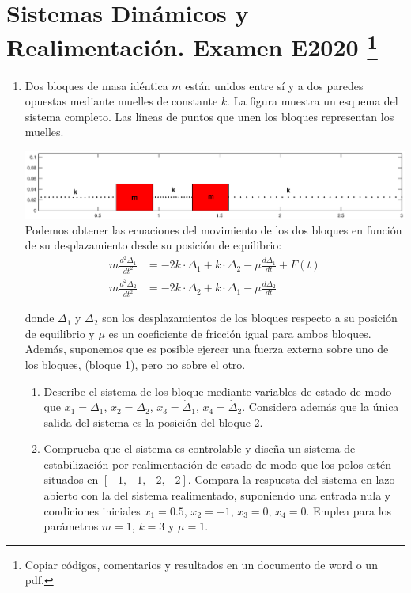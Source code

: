 \documentclass[10pt,a4paper]{article}
\begin{document}
\thispagestyle{fancy}

\section*{Sistemas Dinámicos y Realimentación. Examen E2020 \protect\footnote{Copiar códigos, comentarios y resultados en un documento de word o un pdf.}}

\begin{enumerate}
\item Dos bloques de masa idéntica $m$ están unidos entre sí y a dos paredes opuestas mediante muelles de constante $k$. La figura muestra un esquema del sistema completo. Las líneas de puntos que unen los bloques representan los muelles.

\includegraphics[width=\textwidth]{bloquecitos.eps}
Podemos obtener las ecuaciones del movimiento de los dos bloques en función de su desplazamiento desde su posición de equilibrio:
\begin{align*}
m\frac{d^2\Delta_1}{dt^2} &= -2k\cdot \Delta_1 +k\cdot \Delta_2 -\mu\frac{d\Delta_1}{dt}+F(t)\\
m\frac{d^2\Delta_2}{dt^2} &= -2k\cdot \Delta_2 +k\cdot \Delta_1 -\mu\frac{d\Delta_2}{dt}
\end{align*}

donde $\Delta_1$ y $\Delta_2$ son los desplazamientos de los bloques respecto a su posición de equilibrio y $\mu$ es un coeficiente de fricción igual para ambos bloques. Además, suponemos que es posible ejercer una fuerza externa sobre uno de los bloques, (bloque 1), pero no sobre el otro.
\begin{enumerate}
\item Describe el sistema de los bloque mediante variables de estado de modo que $x_1=\Delta_1$, $x_2 =\Delta_2$, $x_3=\dot{\Delta}_1$, $x_4=\dot{\Delta}_2$.
Considera además que la única salida del sistema es la posición del bloque 2.  
\item Comprueba que el sistema es controlable y diseña un sistema de estabilización por realimentación de estado de modo que los polos estén situados en $[-1, -1, -2, -2]$. Compara la respuesta del sistema en lazo abierto con la del sistema realimentado, suponiendo una entrada nula y condiciones iniciales $x_1=0.5$, $x_2=-1$, $x_3=0$, $x_4=0$. Emplea para los parámetros  $m= 1$, $k=3$ y $\mu=1$. 


\end{enumerate}
\end{enumerate}
\end{document}

